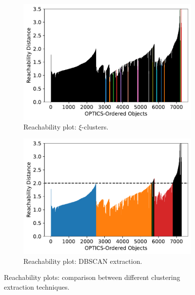 \documentclass[10pt, a4paper, twocolumn]{article}
\begin{document}
\begin{figure}
\centering
\begin{subfigure}[t]{0.49\columnwidth}
    \includegraphics[width=\linewidth]{immagini simone/optics_xi_reach_plot.pdf}
    \caption{Reachability plot: $\xi$-clusters.}
    \label{fig:optics_xi_reach_plot}
\end{subfigure}
\begin{subfigure}[t]{0.49\columnwidth}
    \includegraphics[width=\linewidth]{immagini simone/optics_dbscan_reach_plot.pdf}
    \caption{Reachability plot: DBSCAN extraction.}
    \label{fig:optics_dbscan_reach_plot}
\end{subfigure}
\caption{Reachability plots: comparison between different clustering extraction techniques.}
\label{fig:reach_plots}
\end{figure}
\end{document}
